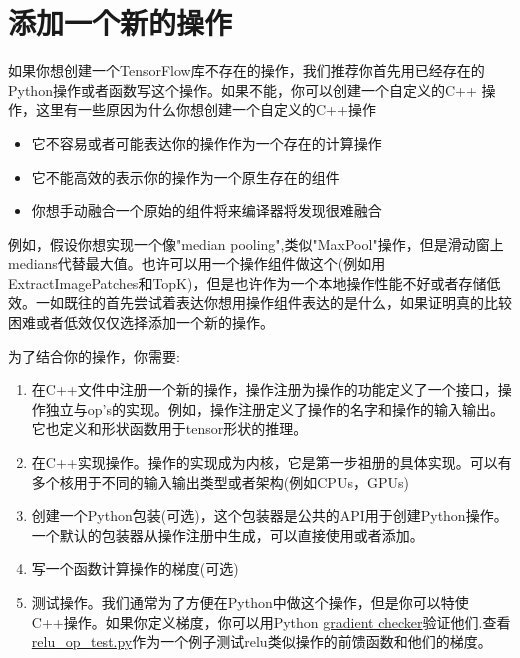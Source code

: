 \documentclass{book}
\begin{document}
\section{添加一个新的操作}
如果你想创建一个TensorFlow库不存在的操作，我们推荐你首先用已经存在的Python操作或者函数写这个操作。如果不能，你可以创建一个自定义的C++
操作，这里有一些原因为什么你想创建一个自定义的C++操作
\begin{itemize}
		\item 它不容易或者可能表达你的操作作为一个存在的计算操作
		\item 它不能高效的表示你的操作为一个原生存在的组件
		\item 你想手动融合一个原始的组件将来编译器将发现很难融合
\end{itemize}
例如，假设你想实现一个像"median pooling",类似"MaxPool"操作，但是滑动窗上medians代替最大值。也许可以用一个操作组件做这个(例如用ExtractImagePatches和TopK)，但是也许作为一个本地操作性能不好或者存储低效。一如既往的首先尝试着表达你想用操作组件表达的是什么，如果证明真的比较困难或者低效仅仅选择添加一个新的操作。

为了结合你的操作，你需要:
\begin{enumerate}
		\item 在C++文件中注册一个新的操作，操作注册为操作的功能定义了一个接口，操作独立与op's的实现。例如，操作注册定义了操作的名字和操作的输入输出。它也定义和形状函数用于tensor形状的推理。
		\item 在C++实现操作。操作的实现成为内核，它是第一步祖册的具体实现。可以有多个核用于不同的输入输出类型或者架构(例如CPUs，GPUs)
		\item 创建一个Python包装(可选)，这个包装器是公共的API用于创建Python操作。一个默认的包装器从操作注册中生成，可以直接使用或者添加。
		\item 写一个函数计算操作的梯度(可选)
		\item 测试操作。我们通常为了方便在Python中做这个操作，但是你可以特使C++操作。如果你定义梯度，你可以用Python \href{https://www.tensorflow.org/api_docs/python/tf/test/compute_gradient_error}{gradient checker}验证他们.查看\href{https://www.github.com/tensorflow/tensorflow/blob/r1.4/tensorflow/python/kernel_tests/relu_op_test.py}{relu_op_test.py}作为一个例子测试relu类似操作的前馈函数和他们的梯度。
\end{enumerate}
\end{document}
